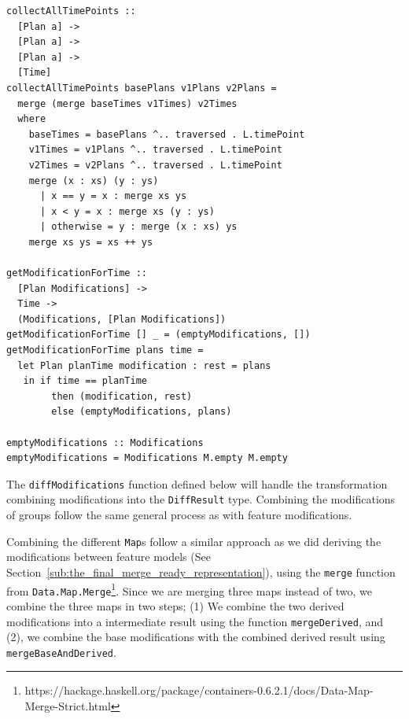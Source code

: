 \documentclass[a4paper,english]{ifimaster}
\begin{document}
\begin{verbatim}
collectAllTimePoints ::
  [Plan a] ->
  [Plan a] ->
  [Plan a] ->
  [Time]
collectAllTimePoints basePlans v1Plans v2Plans =
  merge (merge baseTimes v1Times) v2Times
  where
    baseTimes = basePlans ^.. traversed . L.timePoint
    v1Times = v1Plans ^.. traversed . L.timePoint
    v2Times = v2Plans ^.. traversed . L.timePoint
    merge (x : xs) (y : ys)
      | x == y = x : merge xs ys
      | x < y = x : merge xs (y : ys)
      | otherwise = y : merge (x : xs) ys
    merge xs ys = xs ++ ys

getModificationForTime ::
  [Plan Modifications] ->
  Time ->
  (Modifications, [Plan Modifications])
getModificationForTime [] _ = (emptyModifications, [])
getModificationForTime plans time =
  let Plan planTime modification : rest = plans
   in if time == planTime
        then (modification, rest)
        else (emptyModifications, plans)

emptyModifications :: Modifications
emptyModifications = Modifications M.empty M.empty
\end{verbatim}

The \texttt{diffModifications} function defined below will handle the transformation combining modifications into the \texttt{DiffResult} type. Combining the modifications of groups follow the same general process as with feature modifications. 

Combining the different \texttt{Map}s follow a similar approach as we did deriving the modifications between feature models (See Section~\vref{sub:the_final_merge_ready_representation}), using the \texttt{merge} function from \texttt{Data.Map.Merge}\footnote{https://hackage.haskell.org/package/containers-0.6.2.1/docs/Data-Map-Merge-Strict.html}. Since we are merging three maps instead of two, we combine the three maps in two steps; (1) We combine the two derived modifications into a intermediate result using the function \texttt{mergeDerived}, and (2), we combine the base modifications with the combined derived result using \texttt{mergeBaseAndDerived}.
\end{document}
